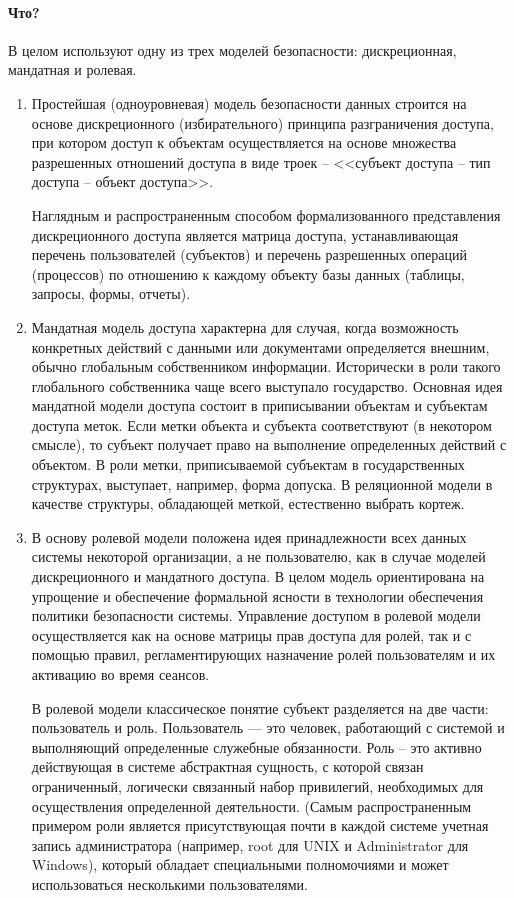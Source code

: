 \paragraph{Что?}
В целом используют одну из трех моделей безопасности: дискреционная, мандатная и ролевая.
\begin{enumerate}
	\item Простейшая (одноуровневая) модель безопасности данных строится на основе дискреционного (избирательного) принципа разграничения доступа, при котором доступ к объектам осуществляется на основе множества разрешенных отношений доступа в виде троек -- <<субъект доступа -- тип доступа -- объект доступа>>.
	
	Наглядным и распространенным способом формализованного представления дискреционного доступа является матрица доступа, устанавливающая перечень пользователей (субъектов) и перечень разрешенных операций (процессов) по отношению к каждому объекту базы данных (таблицы, запросы, формы, отчеты).
	
	\item Мандатная модель доступа характерна для случая, когда возможность конкретных действий с данными или документами определяется внешним, обычно глобальным собственником информации. Исторически в роли такого глобального собственника чаще всего выступало государство. Основная идея мандатной модели доступа состоит в приписывании объектам и субъектам доступа меток. Если метки объекта и субъекта соответствуют (в некотором смысле), то субъект получает право на выполнение определенных действий с объектом. В роли метки, приписываемой субъектам в государственных структурах, выступает, например, форма допуска. В реляционной модели в качестве структуры, обладающей меткой, естественно выбрать кортеж.
	
	\item В основу ролевой модели положена идея принадлежности всех данных системы некоторой организации, а не пользователю, как в случае моделей дискреционного и мандатного доступа. В целом модель ориентирована на упрощение и обеспечение формальной ясности в технологии обеспечения политики безопасности системы. Управление доступом в ролевой модели осуществляется как на основе матрицы прав доступа для ролей, так и с помощью правил, регламентирующих назначение ролей пользователям и их
	активацию во время сеансов.
	
	В ролевой модели классическое понятие субъект разделяется на две части: пользователь и роль. Пользователь — это человек, работающий с системой и выполняющий определенные служебные обязанности. Роль -- это активно действующая в системе абстрактная сущность, с которой связан ограниченный, логически связанный набор привилегий, необходимых для осуществления определенной деятельности. (Самым распространенным примером роли явля­ется присутствующая почти в каждой системе учетная запись администратора (например, root для UNIX и Administrator для Windows), который обладает специальными полномочиями и может использоваться несколькими пользователями.
	

\end{enumerate}
